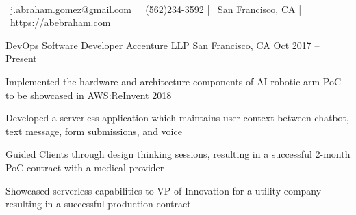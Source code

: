 \documentclass[]{awesome-cv}
\begin{document}
    
\begin{center}
	  \\
	\vspace{2mm}
	{\faEnvelopeO\ j.abraham.gomez@gmail.com} | {\faMobile\ (562)234-3592} | {\faStreetView\ San Francisco, CA} | {\faGlobe\ https://abebraham.com}
\end{center}

\begin{cventries}
	\cventry
	{DevOps Software Developer}
	{Accenture LLP}
	{San Francisco, CA}
	{Oct 2017 – Present}
	{\begin{cvitems}
		\item {Implemented the hardware and architecture components of AI robotic arm PoC to be showcased in AWS:ReInvent 2018}
		\item {Developed a serverless application which maintains user context between chatbot, text message, form submissions, and voice}
		\item {Guided Clients through design thinking sessions, resulting in a successful 2-month PoC contract with a medical provider}
		\item {Showcased serverless capabilities to VP of Innovation for a utility company resulting in a successful production contract}
		\end{cvitems}}


\end{cventries}
\end{document}
